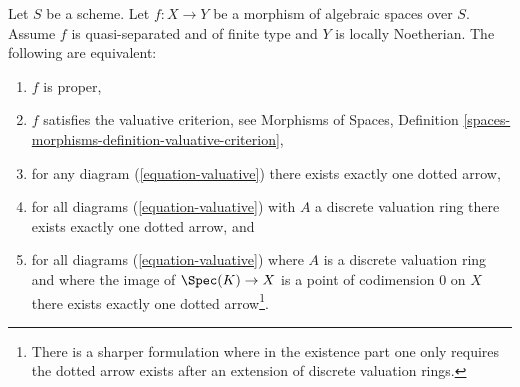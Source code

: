 \begin{lemma}
\label{lemma-Noetherian-dvr-valuative-proper}
Let $S$ be a scheme. Let $f : X \to Y$ be a morphism of algebraic spaces
over $S$. Assume $f$ is quasi-separated and of finite type and $Y$
is locally Noetherian. The following are equivalent:
\begin{enumerate}
\item $f$ is proper,
\item $f$ satisfies the valuative criterion, see
Morphisms of Spaces, Definition
\ref{spaces-morphisms-definition-valuative-criterion},
\item for any diagram (\ref{equation-valuative}) there exists exactly
one dotted arrow,
\item for all diagrams (\ref{equation-valuative}) with $A$ a discrete
valuation ring there exists exactly one dotted arrow, and
\item for all diagrams (\ref{equation-valuative}) where $A$ is a discrete
valuation ring and where the image of $\Spec(K) \to X$ is a point of
codimension $0$ on $X$ there exists exactly one dotted arrow\footnote{There is
a sharper formulation where in the existence part one only requires
the dotted arrow exists after an extension of discrete valuation rings.}.
\end{enumerate}
\end{lemma}


